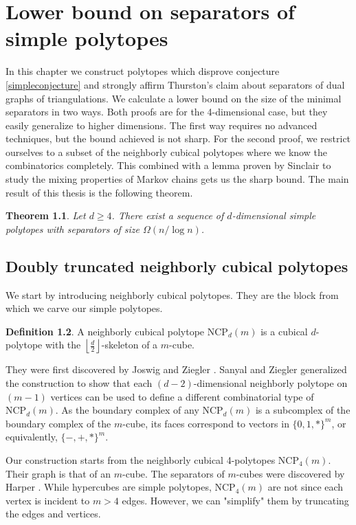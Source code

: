 \documentclass[a4paper,12pt]{book}
\theoremstyle{plain}
\newtheorem{theorem}{Theorem}[section]
\theoremstyle{definition}
\newtheorem{definition}[theorem]{Definition}
\newcommand\NC{\textrm{NCP}}
\begin{document}
\chapter{Lower bound on separators of simple polytopes}
\label{ncpconstruction}

In this chapter we construct polytopes which disprove conjecture \ref{simpleconjecture} and
strongly affirm Thurston's claim about separators of dual graphs of triangulations. We
calculate a lower bound on the size of the minimal separators in two ways. Both proofs are for the
4-dimensional case, but they easily generalize to higher dimensions. The first way requires
no advanced techniques, but the bound achieved is not sharp. For the second proof,
we restrict ourselves to a subset of the neighborly cubical polytopes where we know the 
combinatorics completely. This combined with a lemma proven by Sinclair to study
the mixing properties of Markov chains gets us the sharp bound. The main result of this
thesis is the following theorem.


\begin{theorem}
\label{maintheorem}
 Let $d\geq 4$. There exist a sequence of $d$-dimensional simple polytopes with
separators of size $\Omega(n/\log n)$.
\end{theorem}

\section{Doubly truncated neighborly cubical polytopes}
\label{ncp}

We start by introducing neighborly cubical polytopes. They are the block from which we carve our simple polytopes.

\begin{definition}
A neighborly cubical polytope $\NC_d(m)$ is a cubical $d$-polytope with the $\left\lfloor \frac{d}{2} 
\right\rfloor$-skeleton of a $m$-cube.
\end{definition}

They were first discovered by Joswig and Ziegler \cite{Z62}. Sanyal and Ziegler \cite{Z102}
generalized the construction to show that each $(d-2)$-dimensional neighborly 
polytope on $(m-1)$ vertices can be used to define a 
different combinatorial type of $\NC_d(m)$. As the boundary complex of any $\NC_d(m)$
is a subcomplex of the boundary complex of the $m$-cube, its faces correspond to vectors
in $\{0,1,*\}^m$, or equivalently, $\{-,+,*\}^m$.


Our construction starts from the neighborly cubical 4-polytopes $\NC_4(m)$. 
Their graph is that of an $m$-cube. The separators of $m$-cubes were discovered by Harper 
\cite{Harp}.
While hypercubes are simple polytopes, $\NC_4(m)$ are not since each vertex is 
incident to $m>4$ edges. However, we can "simplify" them by 
truncating the edges and vertices.
\end{document}
